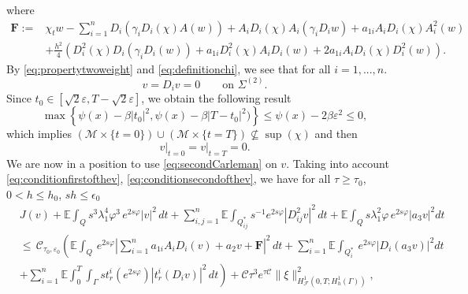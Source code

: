 \documentclass[11pt,oneside,leqno]{amsart}
\numberwithin{equation}{section}
\numberwithin{equation}{section}
\newcommand{\E}{\mathbb{E}}
\begin{document}
where
\begin{equation*}
    \begin{split}
        \mathbf{F}:= &\chi_{t}w-\sum_{i=1}^{n}D_i(\gamma_iD_i(\chi)A(w))+A_iD_i(\chi)A_i(\gamma_iD_iw)+a_{1i}A_iD_i(\chi)A_i^2(w)\\
        &+\frac{h^2}{4}\left(D_i^2(\chi)D_i(\gamma_iD_i(w))+a_{1i}D_i^2(\chi)A_iD_i(w)+2a_{1i}A_iD_i(\chi)D_i^2(w)\right).  
    \end{split}
\end{equation*}
By \eqref{eq:propertytwoweight} and \eqref{eq:definitionchi}, we see that for all $i{ =1,...,n.}$
\begin{equation}\label{eq:conditionfirstofthev}
    v=D_{i}v=0\quad\quad\text{on}\,\,  \Sigma^{(2)}.
\end{equation}
Since $t_0\in [\sqrt{2}\varepsilon,T-\sqrt{2}\varepsilon]$, we obtain the following result
\begin{equation*}
    \max\left\{\psi(x)-\beta |t_0|^2,\psi(x)-\beta|T-t_0|^2)\right\}\leq \psi(x)-2\beta \varepsilon^2\leq 0,
\end{equation*}
which implies $(\mathcal{M}\times\{t=0\})\cup (\mathcal{M}\times\{t=T\})\nsubseteq \sup{(\chi)}$ and then 
\begin{equation}\label{eq:conditionsecondofthev}
\left.v\right|_{t=0}=\left.v\right|_{t=T}=0.
\end{equation}
We are now in a position to use \eqref{eq:secondCarleman} on $v$. Taking into account \eqref{eq:conditionfirstofthev}, \eqref{eq:conditionsecondofthev}, we have for all $\tau\geq \tau_0$, $0<h\leq h_0$, $sh\leq \epsilon_0$
\begin{equation*}
\begin{split}
&J(v)+\E\int_{Q}s^{3}\lambda^{4}_{1}\varphi^{3}\,e^{2s\varphi}|v|^{2}\,dt+\sum_{i,j=1}^{n}\E\int_{Q_{ij}^\ast}s^{-1}e^{2s\varphi}|D_{ij}^2v|^2\, dt+\E\int_{Q}s\lambda_{1}^2\varphi\,e^{2s\varphi}|a_3 v|^2dt\\
&\leq\,\mathcal{C}_{\tau_{0},\varepsilon_0}\left(\E\int_{Q}\,e^{2s\varphi}\left|\sum_{i=1}^{n}a_{1i}A_iD_i(v)+a_2v+\mathbf{F}\right|^2\,dt+\sum_{i=1}^{n}\E\int_{Q_i^{\ast}}\,e^{2s\varphi}|D_i(a_3v)|^2dt\right.\\
&\left.+\sum_{i=1}^{n}\E\int_0^T\int_{\Gamma}st_{r}^{i}(e^{2s\varphi})|t_{r}^{i}(D_iv)|^2\,dt\right)+\mathcal{C}\tau^3e^{\tau\mathcal{C}}\|\xi\|^2_{H^1_{\mathcal{F}}(0,T;H_h^1(\Gamma))},
\end{split}
\end{equation*}
\end{document}
